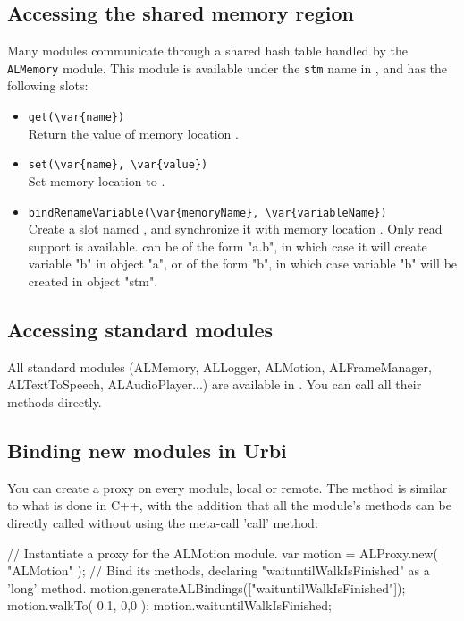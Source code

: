 \subsection{Accessing the \naoqi shared memory region}

Many \naoqi modules communicate through a shared hash table handled by
the \lstinline|ALMemory| module. This module is available under the
\lstinline|stm| name in \urbi, and has the following slots:

\begin{itemize}
\item \lstinline|get(\var{name})| \\
  Return the value of memory location .
\item \lstinline|set(\var{name}, \var{value})| \\
  Set memory location  to .
\item \lstinline|bindRenameVariable(\var{memoryName}, \var{variableName})| \\
  Create a \us slot named , and synchronize it with memory
  location . Only read support is available.
   can be of the form "a.b", in which case it will create
  variable "b" in object "a", or of the form "b", in which case variable "b"
  will be created in object "stm".
\end{itemize}

\subsection{Accessing standard \naoqi modules}

All standard \naoqi modules (ALMemory, ALLogger, ALMotion, ALFrameManager,
ALTextToSpeech, ALAudioPlayer...) are available in \urbi. You can call all
their methods directly.

\subsection{Binding new \naoqi modules in Urbi}

You can create a proxy on every \naoqi module, local or remote.
The method is similar to what is done in C++, with the addition that all the
module's methods can be directly called without using the meta-call 'call'
method:

\begin{urbiunchecked}
// Instantiate a proxy for the ALMotion module.
var motion = ALProxy.new( "ALMotion" );
// Bind its methods, declaring "waituntilWalkIsFinished" as a 'long' method.
motion.generateALBindings(["waituntilWalkIsFinished"]);
motion.walkTo( 0.1, 0,0 );
motion.waituntilWalkIsFinished;
\end{urbiunchecked}

